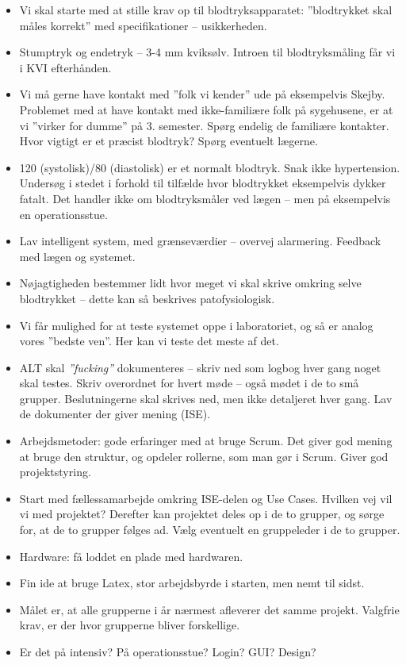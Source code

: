 \documentclass[a4paper,11pt,oneside]{memoir}
\begin{document}
\begin{itemize}
\item Vi skal starte med at stille krav op til blodtryksapparatet: ”blodtrykket skal måles korrekt” med specifikationer – usikkerheden. 

\item Stumptryk og endetryk – 3-4 mm kviksølv. Introen til blodtryksmåling får vi i KVI efterhånden. 

\item Vi må gerne have kontakt med ”folk vi kender” ude på eksempelvis Skejby. Problemet med at have kontakt med ikke-familiære folk på sygehusene, er at vi ”virker for dumme” på 3. semester. Spørg endelig de familiære kontakter. Hvor vigtigt er et præcist blodtryk? Spørg eventuelt lægerne. 

\item 120 (systolisk)/80 (diastolisk) er et normalt blodtryk. Snak ikke hypertension. Undersøg i stedet i forhold til tilfælde hvor blodtrykket eksempelvis dykker fatalt. Det handler ikke om blodtryksmåler ved lægen – men på eksempelvis en operationsstue. 
\item Lav intelligent system, med grænseværdier – overvej alarmering. Feedback med lægen og systemet.
\item Nøjagtigheden bestemmer lidt hvor meget vi skal skrive omkring selve blodtrykket – dette kan så beskrives patofysiologisk. 
\item Vi får mulighed for at teste systemet oppe i laboratoriet, og så er analog vores ”bedste ven”. Her kan vi teste det meste af det. 
\item ALT skal \textit{”fucking”} dokumenteres – skriv ned som logbog hver gang noget skal testes. Skriv overordnet for hvert møde – også mødet i de to små grupper. Beslutningerne skal skrives ned, men ikke detaljeret hver gang. Lav de dokumenter der giver mening (ISE).
\item Arbejdsmetoder: gode erfaringer med at bruge Scrum. Det giver god mening at bruge den struktur, og opdeler rollerne, som man gør i Scrum. Giver god projektstyring. 
\item Start med fællessamarbejde omkring ISE-delen og Use Cases. Hvilken vej vil vi med projektet? Derefter kan projektet deles op i de to grupper, og sørge for, at de to grupper følges ad. Vælg eventuelt en gruppeleder i de to grupper. 
\item Hardware: få loddet en plade med hardwaren. 
\item Fin ide at bruge Latex, stor arbejdsbyrde i starten, men nemt til sidst. 
\item Målet er, at alle grupperne i år nærmest afleverer det samme projekt. Valgfrie krav, er der hvor grupperne bliver forskellige. 
\item Er det på intensiv? På operationsstue? Login? GUI? Design? 

\end{itemize}
\end{document}
